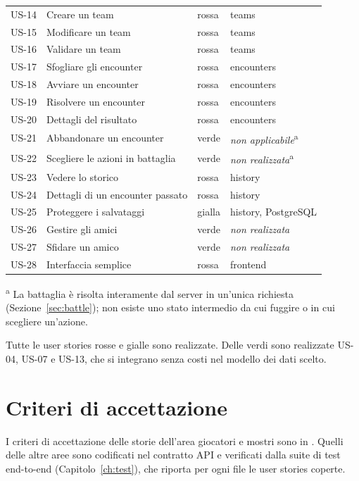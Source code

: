 \documentclass[11pt,a4paper]{report}
\newcommand{\us}[1]{US-#1}
\begin{document}
\begin{xltabular}{\linewidth}{@{}P{1.3cm}LP{1.6cm}P{3.2cm}@{}}
\us{14} & Creare un team & rossa & teams \\
\us{15} & Modificare un team & rossa & teams \\
\us{16} & Validare un team & rossa & teams \\
\us{17} & Sfogliare gli encounter & rossa & encounters \\
\us{18} & Avviare un encounter & rossa & encounters \\
\us{19} & Risolvere un encounter & rossa & encounters \\
\us{20} & Dettagli del risultato & rossa & encounters \\
\us{21} & Abbandonare un encounter & verde & \emph{non applicabile}\textsuperscript{a} \\
\us{22} & Scegliere le azioni in battaglia & verde & \emph{non realizzata}\textsuperscript{a} \\
\us{23} & Vedere lo storico & rossa & history \\
\us{24} & Dettagli di un encounter passato & rossa & history \\
\us{25} & Proteggere i salvataggi & gialla & history, PostgreSQL \\
\us{26} & Gestire gli amici & verde & \emph{non realizzata} \\
\us{27} & Sfidare un amico & verde & \emph{non realizzata} \\
\us{28} & Interfaccia semplice & rossa & frontend \\
\end{xltabular}
{\footnotesize \textsuperscript{a} La battaglia è risolta interamente dal server in un'unica richiesta (Sezione~\ref{sec:battle}); non esiste uno stato intermedio da cui fuggire o in cui scegliere un'azione.\par}

Tutte le user stories rosse e gialle sono realizzate. Delle verdi sono realizzate US-04, US-07 e US-13, che si integrano senza costi nel modello dei dati scelto.

\section{Criteri di accettazione}

I criteri di accettazione delle storie dell'area giocatori e mostri sono in . Quelli delle altre aree sono codificati nel contratto API e verificati dalla suite di test end-to-end (Capitolo~\ref{ch:test}), che riporta per ogni file le user stories coperte.
\end{document}

